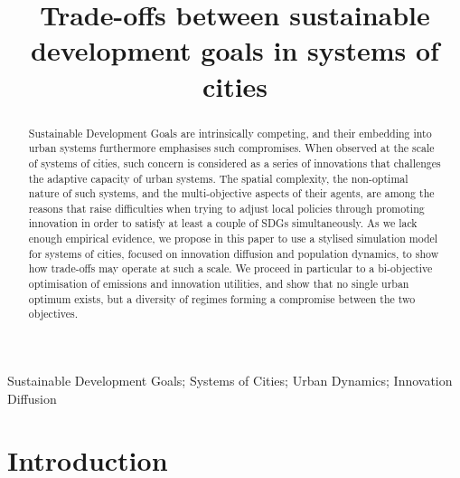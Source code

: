 \documentclass[final,5p,times,twocolumn,authoryear]{elsarticle}
\begin{document}
\begin{frontmatter}

\title{Trade-offs between sustainable development goals in systems of cities}

\author{}





\begin{abstract}
    
    Sustainable Development Goals are intrinsically competing, and their embedding into urban systems furthermore emphasises such compromises. When observed at the scale of systems of cities, such concern is considered as a series of innovations that challenges the adaptive capacity of urban systems. The spatial complexity, the non-optimal nature of such systems, and the multi-objective aspects of their agents, are among the reasons that raise difficulties when trying to adjust local policies through promoting innovation in order to satisfy at least a couple of SDGs simultaneously. As we lack enough empirical evidence, we propose in this paper to use a stylised simulation model for systems of cities, focused on innovation diffusion and population dynamics, to show how trade-offs may operate at such a scale. We proceed in particular to a bi-objective optimisation of emissions and innovation utilities, and show that no single urban optimum exists, but a diversity of regimes forming a compromise between the two objectives.
\end{abstract}

\begin{keyword}
Sustainable Development Goals; Systems of Cities; Urban Dynamics; Innovation Diffusion
\end{keyword}

\end{frontmatter}


\linenumbers

\section{Introduction}
\end{document}
